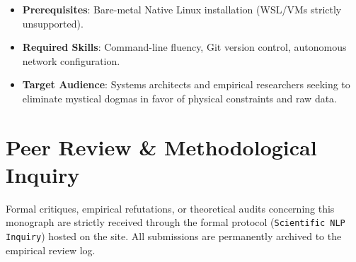     \begin{itemize}
        \item \textbf{Prerequisites}: Bare-metal Native Linux installation (WSL/VMs strictly unsupported).
        \item \textbf{Required Skills}: Command-line fluency, Git version control, autonomous network configuration.
        \item \textbf{Target Audience}: Systems architects and empirical researchers seeking to eliminate mystical dogmas in favor of physical constraints and raw data.
    \end{itemize}

    \section*{Peer Review \& Methodological Inquiry}
    Formal critiques, empirical refutations, or theoretical audits concerning this monograph are strictly received through the formal protocol (\texttt{Scientific NLP Inquiry}) hosted on the site. All submissions are permanently archived to the empirical review log.

\fi
